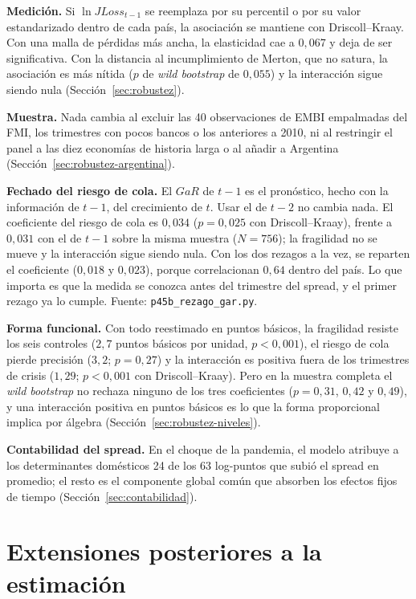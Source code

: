 \textbf{Medición.} Si $\ln JLoss_{t-1}$ se reemplaza por su percentil o por su valor estandarizado dentro de cada país, la asociación se mantiene con Driscoll--Kraay. Con una malla de pérdidas más ancha, la elasticidad cae a $0{,}067$ y deja de ser significativa. Con la distancia al incumplimiento de Merton, que no satura, la asociación es más nítida ($p$ de \textit{wild bootstrap} de $0{,}055$) y la interacción sigue siendo nula (Sección~\ref{sec:robustez}).

\textbf{Muestra.} Nada cambia al excluir las 40 observaciones de EMBI empalmadas del FMI, los trimestres con pocos bancos o los anteriores a 2010, ni al restringir el panel a las diez economías de historia larga o al añadir a Argentina (Sección~\ref{sec:robustez-argentina}).

\textbf{Fechado del riesgo de cola.} El $GaR$ de $t-1$ es el pronóstico, hecho con la información de $t-1$, del crecimiento de $t$. Usar el de $t-2$ no cambia nada. El coeficiente del riesgo de cola es $0{,}034$ ($p=0{,}025$ con Driscoll--Kraay), frente a $0{,}031$ con el de $t-1$ sobre la misma muestra ($N=756$); la fragilidad no se mueve y la interacción sigue siendo nula. Con los dos rezagos a la vez, se reparten el coeficiente ($0{,}018$ y $0{,}023$), porque correlacionan $0{,}64$ dentro del país. Lo que importa es que la medida se conozca antes del trimestre del spread, y el primer rezago ya lo cumple. Fuente: \texttt{p45b\_rezago\_gar.py}.

\textbf{Forma funcional.} Con todo reestimado en puntos básicos, la fragilidad resiste los seis controles ($2{,}7$ puntos básicos por unidad, $p<0{,}001$), el riesgo de cola pierde precisión ($3{,}2$; $p=0{,}27$) y la interacción es positiva fuera de los trimestres de crisis ($1{,}29$; $p<0{,}001$ con Driscoll--Kraay). Pero en la muestra completa el \textit{wild bootstrap} no rechaza ninguno de los tres coeficientes ($p=0{,}31$, $0{,}42$ y $0{,}49$), y una interacción positiva en puntos básicos es lo que la forma proporcional implica por álgebra (Sección~\ref{sec:robustez-niveles}).

\textbf{Contabilidad del spread.} En el choque de la pandemia, el modelo atribuye a los determinantes domésticos 24 de los 63 log-puntos que subió el spread en promedio; el resto es el componente global común que absorben los efectos fijos de tiempo (Sección~\ref{sec:contabilidad}).

\section{Extensiones posteriores a la estimación}
\label{sec:extensiones}

